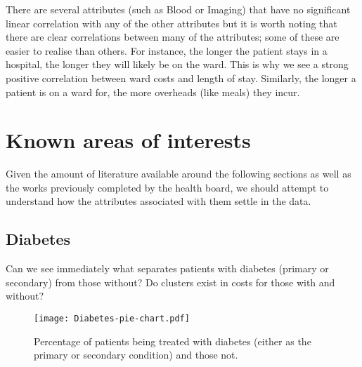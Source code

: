 \documentclass{article}
\begin{document}
There are several attributes (such as Blood or Imaging) that have no significant
linear correlation with any of the other attributes but it is worth noting that
there are clear correlations between many of the attributes; some of these are
easier to realise than others. For instance, the longer the patient stays in a
hospital, the longer they will likely be on the ward. This is why we see a 
strong positive correlation between ward costs and length of stay. Similarly, 
the longer a patient is on a ward for, the more overheads (like meals) they 
incur.



\section{Known areas of interests}\label{section:known}

Given the amount of literature available around the following sections as well
as the works previously completed by the health board, we should attempt to
understand how the attributes associated with them settle in the data.

\subsection{Diabetes}\label{subsection:diabetes}

Can we see immediately what separates patients with diabetes (primary or
secondary) from those without? Do clusters exist in costs for those with and
without?

\begin{wrapfigure}{r}{.3\textwidth}\label{fig:diabetes-pie}
	\centering
	\texttt{[image: Diabetes-pie-chart.pdf]}
	\caption{Percentage of patients being treated with diabetes (either as
	the primary or secondary condition) and those not.}
\end{wrapfigure}
\end{document}
